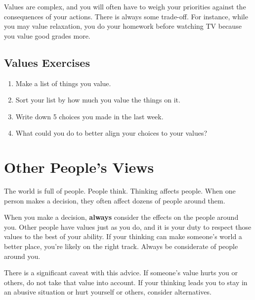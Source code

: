 Values are complex, and you will often have to weigh your priorities against the consequences of your actions. There is always some trade-off. For instance, while you may value relaxation, you do your homework before watching TV because you value good grades more.

\section*{Values Exercises}

\begin{enumerate}
	\item Make a list of things you value.
	\item Sort your list by how much you value the things on it.
	\item Write down 5 choices you made in the last week.
	\item What could you do to better align your choices to your values?
\end{enumerate}



\chapter{Other People's Views}


The world is full of people. People think. Thinking affects people. When one person makes a decision, they often affect dozens of people around them. 

When you make a decision, \textbf{always} consider the effects on the people around you. Other people have values just as you do, and it is your duty to respect those values to the best of your ability. If your thinking can make someone's world a better place, you're likely on the right track. Always be considerate of people around you.

There is a significant caveat with this advice. If someone's value hurts you or others, do not take that value into account. If your thinking leads you to stay in an abusive situation or hurt yourself or others, consider alternatives. 

